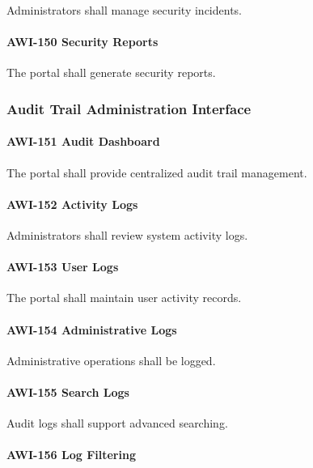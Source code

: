 Administrators shall manage security incidents.

\paragraph{AWI-150 Security Reports}

The portal shall generate security reports.


\subsubsection*{Audit Trail Administration Interface}

\paragraph{AWI-151 Audit Dashboard}

The portal shall provide centralized audit trail management.

\paragraph{AWI-152 Activity Logs}

Administrators shall review system activity logs.

\paragraph{AWI-153 User Logs}

The portal shall maintain user activity records.

\paragraph{AWI-154 Administrative Logs}

Administrative operations shall be logged.

\paragraph{AWI-155 Search Logs}

Audit logs shall support advanced searching.

\paragraph{AWI-156 Log Filtering}

